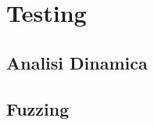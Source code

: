 \section{Testing}
\label{sec:testing}

\subsection{Analisi Dinamica}
\label{sec:analisi-dinamica}

\subsection{Fuzzing}
\label{sec:fuzzing}